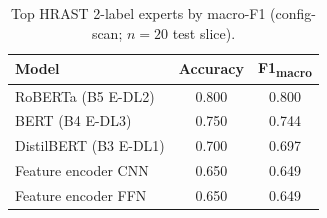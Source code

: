 \begin{table}[t]
  \centering
  \caption{Top HRAST 2-label experts by macro-F1 (config-scan; $n{=}20$ test slice).}
  \label{tab:hrast_top2}
  \begin{tabular}{@{}lcc@{}}
    \toprule
    \textbf{Model} & \textbf{Accuracy} & \textbf{F1\textsubscript{macro}} \\
    \midrule
    RoBERTa (B5 E-DL2) & 0.800 & 0.800 \\
    BERT (B4 E-DL3) & 0.750 & 0.744 \\
    DistilBERT (B3 E-DL1) & 0.700 & 0.697 \\
    Feature encoder CNN & 0.650 & 0.649 \\
    Feature encoder FFN & 0.650 & 0.649 \\
    \bottomrule
  \end{tabular}
\end{table}

